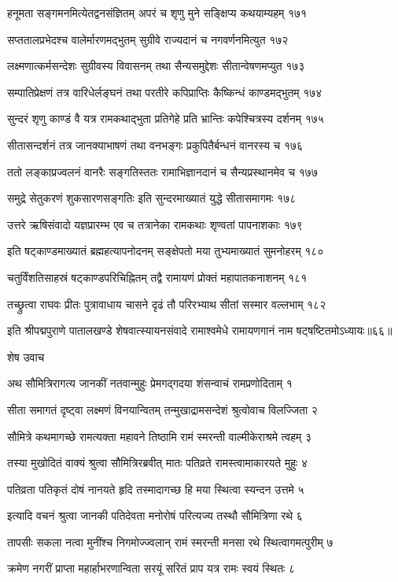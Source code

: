 हनूमता सङ्गमनमित्येतद्वनसंज्ञितम्
अपरं च शृणु मुने सङ्क्षिप्य कथयाम्यहम् १७१

सप्ततालप्रभेदश्च वालेर्मारणमद्भुतम्
सुग्रीवे राज्यदानं च नगवर्णनमित्युत १७२

लक्ष्मणात्कर्मसन्देशः सुग्रीवस्य विवासनम्
तथा सैन्यसमुद्देशः सीतान्वेषणमप्युत १७३

सम्पातिप्रेक्षणं तत्र वारिधेर्लङ्घनं तथा
परतीरे कपिप्राप्तिः कैष्किन्धं काण्डमद्भुतम् १७४

सुन्दरं शृणु काण्डं वै यत्र रामकथाद्भुता
प्रतिगेहे प्रति भ्रान्तिः कपेश्चित्रस्य दर्शनम् १७५

सीतासन्दर्शनं तत्र जानक्याभाषणं तथा
वनभङ्गः प्रकुपितैर्बन्धनं वानरस्य च १७६

ततो लङ्काप्रज्वलनं वानरैः सङ्गतिस्ततः
रामाभिज्ञानदानं च सैन्यप्रस्थानमेव च १७७

समुद्रे सेतुकरणं शुकसारणसङ्गतिः
इति सुन्दरमाख्यातं युद्धे सीतासमागमः १७८

उत्तरे ऋषिसंवादो यज्ञप्रारम्भ एव च
तत्रानेका रामकथाः शृण्वतां पापनाशकाः १७९

इति षट्काण्डमाख्यातं ब्रह्महत्यापनोदनम्
सङ्क्षेपतो मया तुभ्यमाख्यातं सुमनोहरम् १८०

चतुर्विंशतिसाहस्रं षट्काण्डपरिचिह्नितम्
तद्वै रामायणं प्रोक्तं महापातकनाशनम् १८१

तच्छ्रुत्वा राघवः प्रीतः पुत्रावाधाय चासने
दृढं तौ परिरभ्याथ सीतां सस्मार वल्लभाम् १८२

इति श्रीपद्मपुराणे पातालखण्डे शेषवात्स्यायनसंवादे रामाश्वमेधे रामायणगानं नाम षट्षष्टितमोऽध्यायः॥६६॥


शेष उवाच

अथ सौमित्रिरागत्य जानकीं नतवान्मुहुः
प्रेमगद्गदया शंसन्वाचं रामप्रणोदिताम् १

सीता समागतं दृष्ट्वा लक्ष्मणं विनयान्वितम्
तन्मुखाद्रामसन्देशं श्रुत्वोवाच विलज्जिता २

सौमित्रे कथमागच्छे रामत्यक्ता महावने
तिष्ठामि रामं स्मरन्ती वाल्मीकेराश्रमे त्वहम् ३

तस्या मुखोदितं वाक्यं श्रुत्वा सौमित्रिरब्रवीत्
मातः पतिव्रते रामस्त्वामाकारयते मुहुः ४

पतिव्रता पतिकृतं दोषं नानयते हृदि
तस्मादागच्छ हि मया स्थित्वा स्यन्दन उत्तमे ५

इत्यादि वचनं श्रुत्वा जानकी पतिदेवता
मनोरोषं परित्यज्य तस्थौ सौमित्रिणा रथे ६

तापसीः सकला नत्वा मुनींश्च निगमोज्ज्वलान्
रामं स्मरन्ती मनसा रथे स्थित्वागमत्पुरीम् ७

क्रमेण नगरीं प्राप्ता महार्हाभरणान्विता
सरयूं सरितं प्राप यत्र रामः स्वयं स्थितः ८

